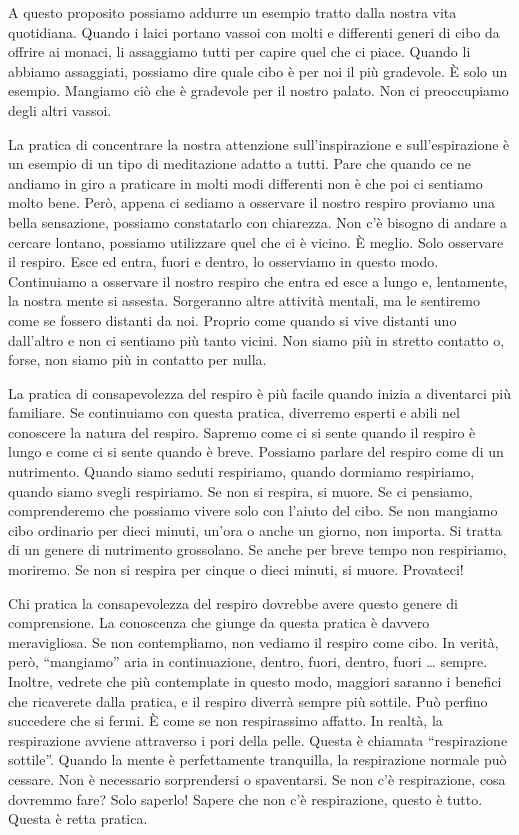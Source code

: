 A questo proposito possiamo addurre un esempio tratto dalla nostra vita
quotidiana. Quando i laici portano vassoi con molti e differenti generi
di cibo da offrire ai monaci, li assaggiamo tutti per capire quel che ci
piace. Quando li abbiamo assaggiati, possiamo dire quale cibo è per noi
il più gradevole. È solo un esempio. Mangiamo ciò che è gradevole per il
nostro palato. Non ci preoccupiamo degli altri vassoi.

La pratica di concentrare la nostra attenzione sull'inspirazione e
sull'espirazione è un esempio di un tipo di meditazione adatto a tutti.
Pare che quando ce ne andiamo in giro a praticare in molti modi
differenti non è che poi ci sentiamo molto bene. Però, appena ci sediamo
a osservare il nostro respiro proviamo una bella sensazione, possiamo
constatarlo con chiarezza. Non c'è bisogno di andare a cercare lontano,
possiamo utilizzare quel che ci è vicino. È meglio. Solo osservare il
respiro. Esce ed entra, fuori e dentro, lo osserviamo in questo modo.
Continuiamo a osservare il nostro respiro che entra ed esce a lungo e,
lentamente, la nostra mente si assesta. Sorgeranno altre attività
mentali, ma le sentiremo come se fossero distanti da noi. Proprio come
quando si vive distanti uno dall'altro e non ci sentiamo più tanto
vicini. Non siamo più in stretto contatto o, forse, non siamo più in
contatto per nulla.

La pratica di consapevolezza del respiro è più facile quando inizia a
diventarci più familiare. Se continuiamo con questa pratica, diverremo
esperti e abili nel conoscere la natura del respiro. Sapremo come ci si
sente quando il respiro è lungo e come ci si sente quando è breve.
Possiamo parlare del respiro come di un nutrimento. Quando siamo seduti
respiriamo, quando dormiamo respiriamo, quando siamo svegli respiriamo.
Se non si respira, si muore. Se ci pensiamo, comprenderemo che possiamo
vivere solo con l'aiuto del cibo. Se non mangiamo cibo ordinario per
dieci minuti, un'ora o anche un giorno, non importa. Si tratta di un
genere di nutrimento grossolano. Se anche per breve tempo non
respiriamo, moriremo. Se non si respira per cinque o dieci minuti, si
muore. Provateci!

Chi pratica la consapevolezza del respiro dovrebbe avere questo genere
di comprensione. La conoscenza che giunge da questa pratica è davvero
meravigliosa. Se non contempliamo, non vediamo il respiro come cibo. In
verità, però, ``mangiamo'' aria in continuazione, dentro, fuori, dentro,
fuori \ldots{} sempre. Inoltre, vedrete che più contemplate in questo modo,
maggiori saranno i benefici che ricaverete dalla pratica, e il respiro
diverrà sempre più sottile. Può perfino succedere che si fermi. È come
se non respirassimo affatto. In realtà, la respirazione avviene
attraverso i pori della pelle. Questa è chiamata ``respirazione
sottile''. Quando la mente è perfettamente tranquilla, la respirazione
normale può cessare. Non è necessario sorprendersi o spaventarsi. Se non
c'è respirazione, cosa dovremmo fare? Solo saperlo! Sapere che non c'è
respirazione, questo è tutto. Questa è retta pratica.

